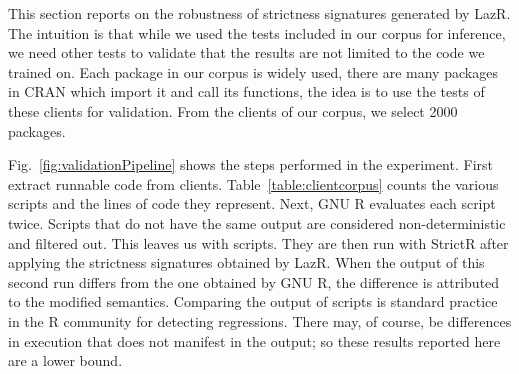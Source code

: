 \documentclass[screen,acmsmall]{acmart}
\newcommand{\strictr}{{\sf StrictR}\xspace}
\newcommand{\lazr}{{\sf LazR}\xspace}
\begin{document}
This section reports on the robustness of strictness signatures generated by
\lazr. The intuition is that while we used the tests included in our corpus for
inference, we need other tests to validate that the results are not limited to
the code we trained on. Each package in our corpus is widely used, there are
many packages in CRAN which import it and call its functions, the idea is to use
the tests of these clients for validation. From the \CorpusDependencyCount
clients of our corpus, we select 2000 packages.

Fig.~\ref{fig:validationPipeline} shows the steps performed in the experiment.
First extract runnable code from clients. Table~\ref{table:clientcorpus} counts
the various scripts and the lines of code they represent. Next, GNU R evaluates
each script twice. Scripts that do not have the same output are considered
non-deterministic and filtered out. This leaves us with
\ValidationBaselineProgramCount scripts. They are then run with \strictr after
applying the strictness signatures obtained by \lazr. When the output of this
second run differs from the one obtained by GNU R, the difference is attributed
to the modified semantics. Comparing the output of scripts is standard practice
in the R community for detecting regressions. There may, of course, be
differences in execution that does not manifest in the output; so these results
reported here are a lower bound.
\end{document}
